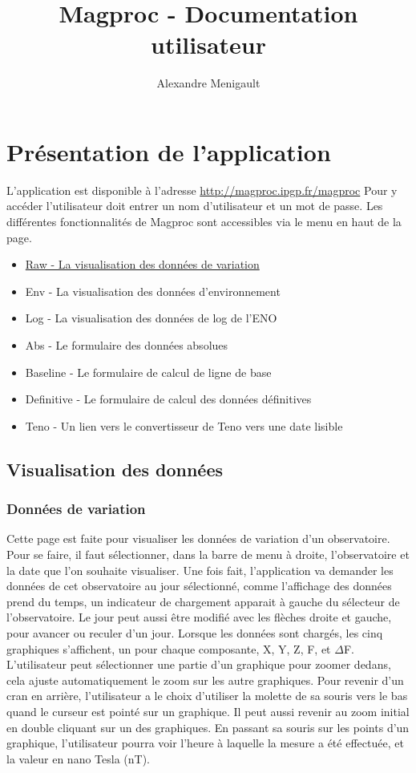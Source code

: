 \documentclass[10pt,a4paper]{report}
\author{Alexandre Menigault}
\title{Magproc - Documentation utilisateur}
\begin{document}
\maketitle

\tableofcontents

\chapter{Présentation de l'application}


L'application est disponible à l'adresse \url{http://magproc.ipgp.fr/magproc}
Pour y accéder l'utilisateur doit entrer un nom d'utilisateur et un mot de passe.
Les différentes fonctionnalités de Magproc sont accessibles via le menu en haut de la page.
\linebreak
\begin{itemize}
\item \hyperref[sec:raw]{Raw - La visualisation des données de variation}
\item Env - La visualisation des données d'environnement
\item Log - La visualisation des données de log de l'ENO
\item Abs - Le formulaire des données absolues
\item Baseline - Le formulaire de calcul de ligne de base
\item Definitive - Le formulaire de calcul des données définitives
\item Teno - Un lien vers le convertisseur de Teno vers une date lisible
\end{itemize}

\section{Visualisation des données}
\subsection{Données de variation}
\label{sec:raw}
Cette page est faite pour visualiser les données de variation d'un observatoire.
\linebreak 
Pour se faire, il faut sélectionner, dans la barre de menu à droite, l'observatoire et la date que l'on souhaite visualiser. Une fois fait, l'application va demander les données de cet observatoire au jour sélectionné, comme l'affichage des données prend du temps, un indicateur de chargement apparait à gauche du sélecteur de l'observatoire. Le jour peut aussi être modifié avec les flèches droite et gauche, pour avancer ou reculer d'un jour. Lorsque les données sont chargés, les cinq graphiques s'affichent, un pour chaque composante, X, Y, Z, F, et $\Delta$F.
\linebreak
L'utilisateur peut sélectionner une partie d'un graphique pour zoomer dedans, cela ajuste automatiquement le zoom sur les autre graphiques. Pour revenir d'un cran en arrière, l'utilisateur a le choix d'utiliser la molette de sa souris vers le bas quand le curseur est pointé sur un graphique. Il peut aussi revenir au zoom initial en double cliquant sur un des graphiques. En passant sa souris sur les points d'un graphique, l'utilisateur pourra voir l'heure à laquelle la mesure a été effectuée, et la valeur en nano Tesla (nT).
\end{document}
